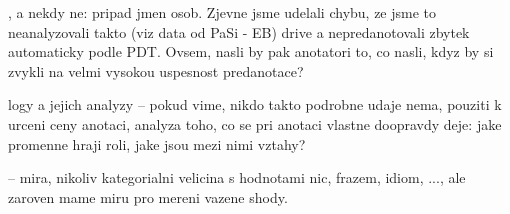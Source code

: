 , a nekdy ne: pripad jmen osob. Zjevne jsme udelali chybu, ze jsme to neanalyzovali takto (viz data od PaSi - EB) drive a nepredanotovali zbytek automaticky podle PDT. Ovsem, nasli by pak anotatori to, co nasli, kdyz by si zvykli na velmi vysokou uspesnost predanotace?

 logy a jejich analyzy -- pokud vime, nikdo takto podrobne udaje nema, pouziti k urceni ceny anotaci, analyza toho, co se pri anotaci vlastne doopravdy deje: jake promenne hraji roli, jake jsou mezi nimi vztahy? 

 -- mira, nikoliv kategorialni velicina s hodnotami nic, frazem, idiom, ..., ale zaroven mame miru pro mereni vazene shody. 
